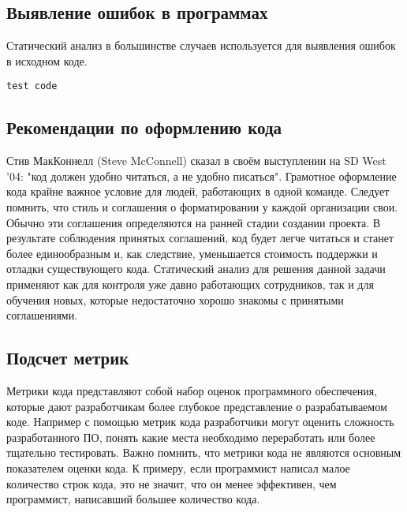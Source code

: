 \subsection {Выявление ошибок в программах}
Статический анализ в большинстве случаев используется для выявления ошибок в исходном коде.
\begin{lstlisting}
test code
\end{lstlisting}
 

\subsection {Рекомендации по оформлению кода}
Стив МакКоннелл (Steve McConnell) сказал в своём выступлении на SD West '04: "код должен удобно 
читаться, а не удобно писаться". Грамотное оформление кода крайне важное условие для людей, работающих
в одной команде. Следует помнить, что стиль и соглашения о форматировании 
у каждой организации свои. Обычно эти соглашения определяются на ранней стадии создании проекта.
В результате соблюдения принятых соглашений, код будет легче читаться и станет более единообразным 
и, как следствие, уменьшается стоимость поддержки и отладки существующего кода.  
Статический анализ для решения данной задачи применяют как для контроля уже давно работающих сотрудников,
так и для обучения новых, которые недостаточно хорошо знакомы с принятыми соглашениями.

\subsection {Подсчет метрик}
Метрики кода представляют собой набор оценок программного обеспечения, которые дают разработчикам 
более глубокое представление о разрабатываемом коде.
Например с помощью метрик кода разработчики могут оценить сложность разработанного ПО,
понять какие места необходимо переработать или более тщательно тестировать. Важно помнить, что метрики
кода не являются основным показателем оценки кода. К примеру, если программист написал малое 
количество строк кода, это не значит, что он менее эффективен, чем программист, написавший большее количество кода.

